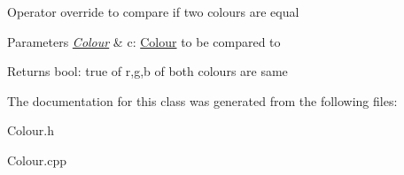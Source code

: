 Operator override to compare if two colours are equal


\begin{DoxyParams}{Parameters}
{\em \hyperlink{classColour}{Colour}} & c\+: \hyperlink{classColour}{Colour} to be compared to \\
\hline
\end{DoxyParams}
\begin{DoxyReturn}{Returns}
bool\+: true of r,g,b of both colours are same 
\end{DoxyReturn}


The documentation for this class was generated from the following files\+:\begin{DoxyCompactItemize}
\item 
Colour.\+h\item 
Colour.\+cpp\end{DoxyCompactItemize}
